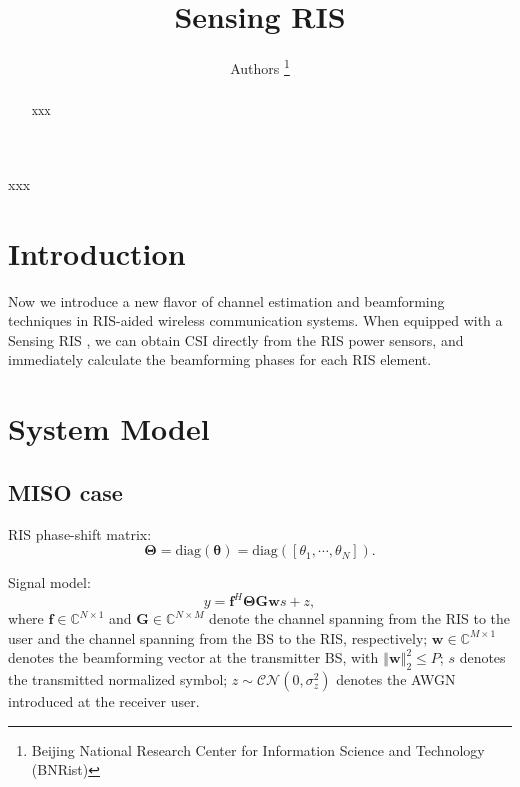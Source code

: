 \documentclass[12pt,draftclsnofoot,journal,onecolumn]{IEEEtran}
\theoremstyle{nonumberplain}
\def \diag {\text{diag}}
\begin{document}
\title{Sensing RIS}
\author{{Authors
\vspace*{-1em}}
\thanks{Beijing National Research Center for Information Science and Technology (BNRist)}
}

\maketitle

\begin{abstract}
xxx
\end{abstract}

\begin{IEEEkeywords}
xxx
\end{IEEEkeywords}
\section{Introduction}
    Now we introduce a new flavor of channel estimation and beamforming techniques in RIS-aided wireless communication systems. When equipped with a Sensing RIS \cite{ma2020smartsensing}, we can obtain CSI directly from the RIS power sensors, and immediately calculate the beamforming phases for each RIS element.
\section{System Model}
\label{System Model}
\subsection{MISO case}
\label{MISO case}

RIS phase-shift matrix:
\begin{equation}
\label{RIS}
\bm \Theta = \diag \left(\bm \theta\right )=\diag \left(\left[\theta_{1},\cdots ,\theta_{N}\right]\right).
\end{equation}

Signal model:
\begin{equation}
\label{Signal model}
y=\bm f^{H}\bm \Theta\bm G\bm ws+z,
\end{equation}
where $\bm f\in \mathbb C ^{N\times 1}$ and $\bm G \in \mathbb C^{N\times M}$ denote the channel spanning from the RIS to the user and the channel spanning from the BS to the RIS, respectively; $\bm w\in \mathbb C^{M\times 1}$ denotes the beamforming vector at the transmitter BS, with $\left\Vert \bm w\right \Vert_{2}^{2}\leq P$; $s$ denotes the transmitted normalized symbol; $z\sim \mathcal{CN}\left(0,\sigma_{z}^{2}\right)$ denotes the \ac{AWGN} introduced at the receiver user.
\end{document}

